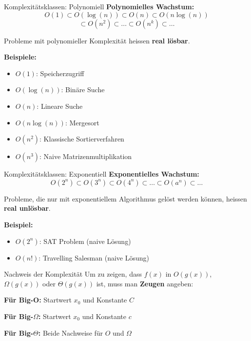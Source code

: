 \documentclass[a4paper, fontsize=7pt]{scrartcl}
\begin{document}
\begin{mainbox}{Komplexitätsklassen: Polynomiell}
\textbf{Polynomielles Wachstum:}
$$O(1) \subset O(\log(n)) \subset O(n) \subset O(n \log(n))$$
$$\subset O(n^2) \subset \ldots \subset O(n^k) \subset \ldots$$

Probleme mit polynomieller Komplexität heissen \textbf{real lösbar}.

\textbf{Beispiele:}
\begin{itemize}
    \item $O(1)$: Speicherzugriff
    \item $O(\log(n))$: Binäre Suche
    \item $O(n)$: Lineare Suche
    \item $O(n \log(n))$: Mergesort
    \item $O(n^2)$: Klassische Sortierverfahren
    \item $O(n^3)$: Naive Matrizenmultiplikation
\end{itemize}
\end{mainbox}

\begin{mainbox}{Komplexitätsklassen: Exponentiell}
\textbf{Exponentielles Wachstum:}
$$O(2^n) \subset O(3^n) \subset O(4^n) \subset \ldots \subset O(a^n) \subset \ldots$$

Probleme, die nur mit exponentiellem Algorithmus gelöst werden können, heissen \textbf{real unlösbar}.

\textbf{Beispiel:}
\begin{itemize}
    \item $O(2^n)$: SAT Problem (naive Lösung)
    \item $O(n!)$: Travelling Salesman (naive Lösung)
\end{itemize}
\end{mainbox}

\begin{subbox}{Nachweis der Komplexität}
Um zu zeigen, dass $f(x)$ in $O(g(x))$, $\Omega(g(x))$ oder $\Theta(g(x))$ ist, muss man \textbf{Zeugen} angeben:

\textbf{Für Big-O:} Startwert $x_0$ und Konstante $C$

\textbf{Für Big-$\Omega$:} Startwert $x_0$ und Konstante $c$

\textbf{Für Big-$\Theta$:} Beide Nachweise für $O$ und $\Omega$
\end{subbox}

\end{document}
